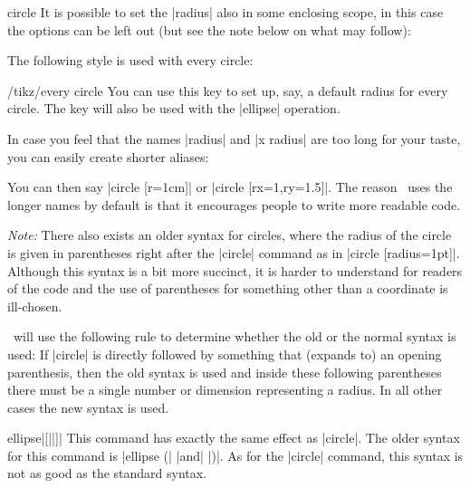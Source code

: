 \begin{pathoperation}{circle}{}
    It is possible to set the |radius| also in some enclosing scope, in this
    case the options can be left out (but see the note below on what may
    follow):
\begin{codeexample}[]
\end{codeexample}

    The following style is used with every circle:
    \begin{stylekey}{/tikz/every circle}
        You can use this key to set up, say, a default radius for every circle.
        The key will also be used with the |ellipse| operation.
    \end{stylekey}

    In case you feel that the names |radius| and |x radius| are too long for
    your taste, you can easily create shorter aliases:
\begin{codeexample}
\end{codeexample}
    You can then say |circle [r=1cm]| or |circle [rx=1,ry=1.5]|. The reason
    \tikzname\ uses the longer names by default is that it encourages people to
    write more readable code.

    \emph{Note:} There also exists an older syntax for circles, where the
    radius of the circle is given in parentheses right after the |circle|
    command as in |circle [radius=1pt]|. Although this syntax is a bit more succinct,
    it is harder to understand for readers of the code and the use of
    parentheses for something other than a coordinate is ill-chosen.

    \tikzname\ will use the following rule to determine whether the old or the
    normal syntax is used: If |circle| is directly followed by something that
    (expands to) an opening parenthesis, then the old syntax is used and inside
    these following parentheses there must be a single number or dimension
    representing a radius. In all other cases the new syntax is used.
\end{pathoperation}

\begin{pathoperation}{ellipse}{|[||]|}
    This command has exactly the same effect as |circle|. The older syntax for
    this command is |ellipse (| |and| |)|. As for
    the |circle| command, this syntax is not as good as the standard syntax.
\begin{codeexample}[]
\end{codeexample}
\end{pathoperation}


